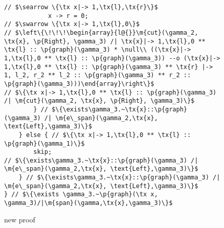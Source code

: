 \documentclass{article}
\newcommand{\tx}[1]{\text{#1}}
\newcommand{\p}[1]{\ensuremath{\mathsf{#1}}} %
\newcommand{\m}[1]{\ensuremath{\mathit{#1}}} %
\begin{document}
\begin{figure}[t]
\begin{lstlisting}
// $\searrow \{\tx x|-> 1,\tx{l},\tx{r}\}$
            x -> r = 0;
// $\swarrow \{\tx x|-> 1,\tx{l},0\}$
// $\left\{\!\!\!\begin{array}{l@{}}\m{cut}(\gamma_2, \tx{x}, \p{Right}, \gamma_3) /| \tx{x}|-> 1,\tx{l},0 ** \tx{l} :: \p{graph}(\gamma_3) * \null\\ ((\tx{x}|-> 1,\tx{l},0 ** \tx{l} :: \p{graph}(\gamma_3)) --o (\tx{x}|-> 1,\tx{l},0 ** \tx{l} :: \p{graph}(\gamma_3) ** \tx{r} |-> 1, l_2, r_2 ** l_2 :: \p{graph}(\gamma_3) ** r_2 :: \p{graph}(\gamma_3)))\end{array}\right\}$
// $\{\tx x|-> 1,\tx{l},0 ** \tx{l} :: \p{graph}(\gamma_3) /| \m{cut}(\gamma_2, \tx{x}, \p{Right}, \gamma_3)\}$
        } // $\{\exists\gamma_3.~\tx{x}::\p{graph}(\gamma_3) /| \m{e\_span}(\gamma_2,\tx{x}, \text{Left},\gamma_3)\}$
    } else { // $\{\tx x|-> 1,\tx{l},0 ** \tx{l} :: \p{graph}(\gamma_1)\}$
        skip;
// $\{\exists\gamma_3.~\tx{x}::\p{graph}(\gamma_3) /| \m{e\_span}(\gamma_2,\tx{x}, \text{Left},\gamma_3)\}$
    } // $\{\exists\gamma_3.~\tx{x}::\p{graph}(\gamma_3) /| \m{e\_span}(\gamma_2,\tx{x}, \text{Left},\gamma_3)\}$
} // $\{\exists \gamma_3.~\p{graph}(\tx x, \gamma_3)/|\m{span}(\gamma,\tx{x},\gamma_3)\}$
\end{lstlisting}
\caption{new proof}
\end{figure}
\end{document}
